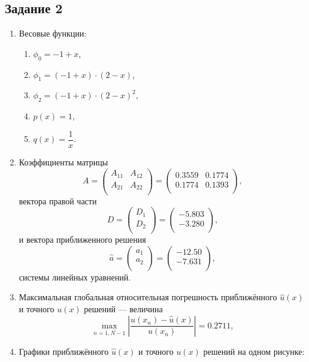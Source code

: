 \documentclass[oneside, final, 12pt]{article}
\begin{document}
\subsection{Задание 2}
\begin{enumerate}
    \item Весовые функции:
    \begin{enumerate}
        \item $\phi_0 = -1 + x$,
        \item $\phi_1 = (-1 + x) \cdot (2 - x)$,
        \item $\phi_2 = (-1 + x) \cdot (2 - x) ^ 2$,
        \item $p(x) = 1$,
        \item $q(x) = \dfrac{1}{x}$.
    \end{enumerate}
    \item Коэффициенты матрицы \begin{equation*}
    A = \begin{pmatrix}
  A_{11} & A_{12} \\
  A_{21} & A_{22} \\
 \end{pmatrix} = \begin{pmatrix}
   0.3559 & 0.1774\\
   0.1774 & 0.1393 \\
  \end{pmatrix},\end{equation*}
 вектора правой части \begin{equation*}D = \begin{pmatrix}
  D_{1} \\
  D_{2} \\
 \end{pmatrix} = \begin{pmatrix}
  -5.803\\
  -3.280 \\
 \end{pmatrix},\end{equation*} и вектора приближенного решения \begin{equation*}\hat{a} = \begin{pmatrix}
  a_{1} \\
  a_{2} \\
 \end{pmatrix} = \begin{pmatrix}
  -12.50\\
  -7.631\\
 \end{pmatrix},\end{equation*} системы линейных уравнений.
    \item Максимальная глобальная относительная погрешность приближённого $\hat{u} (x)$ и точного $u(x)$  решений — величина
    \begin{equation*}
        \max\limits_{n = \overline{1, N-1}} \left| \dfrac{u(x_n) - \hat{u}(x)}{u(x_n)} \right| = 0.2711,
    \end{equation*}
    \item Графики приближённого $\hat{u}(x)$ и точного $u(x)$ решений на одном рисунке:


\end{enumerate}
\end{document}
